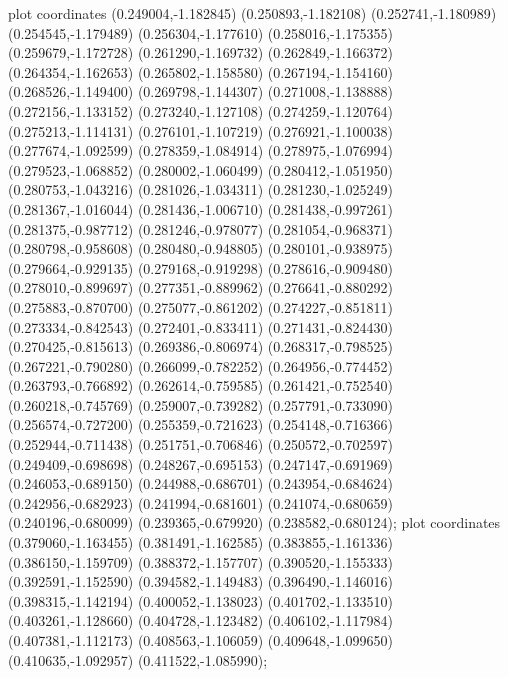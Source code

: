 { plot coordinates {(0.249004,-1.182845) (0.250893,-1.182108) (0.252741,-1.180989) (0.254545,-1.179489) (0.256304,-1.177610) (0.258016,-1.175355) (0.259679,-1.172728) (0.261290,-1.169732) (0.262849,-1.166372) (0.264354,-1.162653) (0.265802,-1.158580) (0.267194,-1.154160) (0.268526,-1.149400) (0.269798,-1.144307) (0.271008,-1.138888) (0.272156,-1.133152) (0.273240,-1.127108) (0.274259,-1.120764) (0.275213,-1.114131) (0.276101,-1.107219) (0.276921,-1.100038) (0.277674,-1.092599) (0.278359,-1.084914) (0.278975,-1.076994) (0.279523,-1.068852) (0.280002,-1.060499) (0.280412,-1.051950) (0.280753,-1.043216) (0.281026,-1.034311) (0.281230,-1.025249) (0.281367,-1.016044) (0.281436,-1.006710) (0.281438,-0.997261) (0.281375,-0.987712) (0.281246,-0.978077) (0.281054,-0.968371) (0.280798,-0.958608) (0.280480,-0.948805) (0.280101,-0.938975) (0.279664,-0.929135) (0.279168,-0.919298) (0.278616,-0.909480) (0.278010,-0.899697) (0.277351,-0.889962) (0.276641,-0.880292) (0.275883,-0.870700) (0.275077,-0.861202) (0.274227,-0.851811) (0.273334,-0.842543) (0.272401,-0.833411) (0.271431,-0.824430) (0.270425,-0.815613) (0.269386,-0.806974) (0.268317,-0.798525) (0.267221,-0.790280) (0.266099,-0.782252) (0.264956,-0.774452) (0.263793,-0.766892) (0.262614,-0.759585) (0.261421,-0.752540) (0.260218,-0.745769) (0.259007,-0.739282) (0.257791,-0.733090) (0.256574,-0.727200) (0.255359,-0.721623) (0.254148,-0.716366) (0.252944,-0.711438) (0.251751,-0.706846) (0.250572,-0.702597) (0.249409,-0.698698) (0.248267,-0.695153) (0.247147,-0.691969) (0.246053,-0.689150) (0.244988,-0.686701) (0.243954,-0.684624) (0.242956,-0.682923) (0.241994,-0.681601) (0.241074,-0.680659) (0.240196,-0.680099) (0.239365,-0.679920) (0.238582,-0.680124)};
 plot coordinates {(0.379060,-1.163455) (0.381491,-1.162585) (0.383855,-1.161336) (0.386150,-1.159709) (0.388372,-1.157707) (0.390520,-1.155333) (0.392591,-1.152590) (0.394582,-1.149483) (0.396490,-1.146016) (0.398315,-1.142194) (0.400052,-1.138023) (0.401702,-1.133510) (0.403261,-1.128660) (0.404728,-1.123482) (0.406102,-1.117984) (0.407381,-1.112173) (0.408563,-1.106059) (0.409648,-1.099650) (0.410635,-1.092957) (0.411522,-1.085990)};
}

